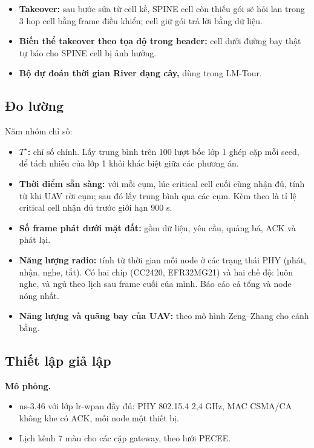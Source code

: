 \begin{itemize}
\tightlist
\item
  \textbf{Takeover:} sau bước sửa từ cell kề, SPINE cell còn thiếu gói
  sẽ hỏi lan trong 3 hop cell bằng frame điều khiển; cell giữ gói trả
  lời bằng dữ liệu.
\item
  \textbf{Biến thể takeover theo tọa độ trong header:} cell dưới đường
  bay thật tự báo cho SPINE cell bị ảnh hưởng.
\item
  \textbf{Bộ dự đoán thời gian River dạng cây,} dùng trong LM-Tour.
\end{itemize}

\subsection{Đo lường}

Năm nhóm chỉ số:

\begin{itemize}
\tightlist
\item
  \textbf{$T^\star$:} chỉ số chính. Lấy trung bình trên 100 lượt bốc lớp 1 ghép
  cặp mỗi seed, để tách nhiễu của lớp 1 khỏi khác biệt giữa các phương
  án.
\item
  \textbf{Thời điểm sẵn sàng:} với mỗi cụm, lúc critical cell cuối cùng
  nhận đủ, tính từ khi UAV rời cụm; sau đó lấy trung bình qua các cụm.
  Kèm theo là tỉ lệ critical cell nhận đủ trước giới hạn 900 s.
\item
  \textbf{Số frame phát dưới mặt đất:} gồm dữ liệu, yêu cầu, quảng bá,
  ACK và phát lại.
\item
  \textbf{Năng lượng radio:} tính từ thời gian mỗi node ở các trạng thái
  PHY (phát, nhận, nghe, tắt). Có hai chip (CC2420, EFR32MG21) và hai
  chế độ: luôn nghe, và ngủ theo lịch sau frame cuối của mình. Báo cáo
  cả tổng và node nóng nhất.
\item
  \textbf{Năng lượng và quãng bay của UAV:} theo mô hình Zeng--Zhang cho
  cánh bằng.
\end{itemize}

\subsection{Thiết lập giả lập}

\textbf{Mô phỏng.}

\begin{itemize}
\tightlist
\item
  ns-3.46 với lớp lr-wpan đầy đủ: PHY 802.15.4 2,4 GHz, MAC CSMA/CA
  không khe có ACK, mỗi node một thiết bị.
\item
  Lịch kênh 7 màu cho các cặp gateway, theo lưới PECEE.
\end{itemize}

